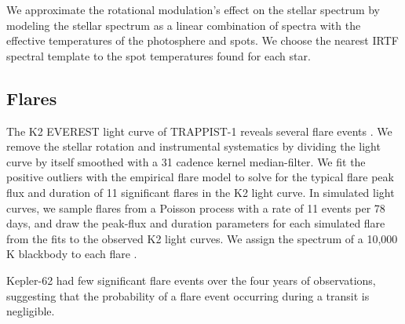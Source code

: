 



We approximate the rotational modulation's effect on the stellar spectrum by modeling the stellar spectrum as a linear combination of spectra with the effective temperatures of the photosphere and spots. %
We choose the nearest IRTF spectral template to the spot temperatures found for each star. 


\subsection{Flares}

The K2 EVEREST light curve of TRAPPIST-1 reveals several flare events \citep{luger2017everest}. We remove the stellar rotation and instrumental systematics by dividing the light curve by itself smoothed with a 31 cadence kernel median-filter. We fit the positive outliers with the \citet{Davenport2014} empirical flare model to solve for the typical flare peak flux and duration of 11 significant flares in the K2 light curve.%
In simulated light curves, we sample flares from a Poisson process with a rate of 11 events per 78 days, and draw the peak-flux and duration parameters for each simulated flare from the fits to the observed K2 light curves. We assign the spectrum of a 10,000 K blackbody to each flare \citep{Kowalski2015}.

Kepler-62 had few significant flare events over the four years of \kepler observations, suggesting that the probability of a flare event occurring during a transit is negligible. 

